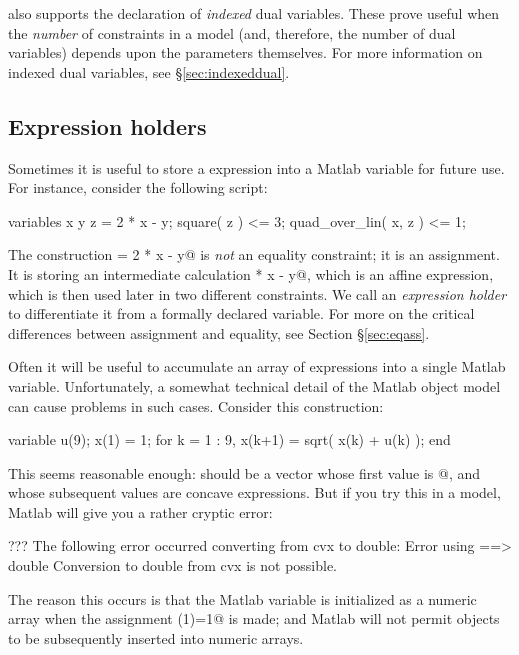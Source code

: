 \documentclass[12pt]{article}
\begin{document}
\cvx also supports the declaration of \emph{indexed} dual
variables. These prove useful when the \emph{number} of constraints in
a model (and, therefore, the number of dual variables) depends upon the
parameters themselves. For more information on indexed dual variables,
see \S\ref{sec:indexeddual}.

\subsection{Expression holders}
\label{sec:holders}

Sometimes it is useful to store a \cvx expression into a Matlab variable for
future use. For instance, consider the following \cvx script:
\begin{code}
	variables x y
	z = 2 * x - y;
	square( z ) <= 3;
	quad_over_lin( x, z ) <= 1;
\end{code}
The construction \verb@z = 2 * x - y@ is \emph{not} an equality constraint; it
is an assignment. It is storing an intermediate calculation  * x - y@,
which is an affine expression,
which is then used later in two different constraints. We call \verb@z@ an
\emph{expression holder} to differentiate it from a 
formally declared \verb@cvx@ variable. For more on the critical
differences between assignment and equality, see Section \S\ref{sec:eqass}.

Often it will be useful to accumulate an array of expressions into a single
Matlab variable. 
Unfortunately, a somewhat technical detail of the Matlab object
model can cause problems in such cases. Consider this construction:
\begin{code}
variable u(9);
x(1) = 1;
for k = 1 : 9,
    x(k+1) = sqrt( x(k) + u(k) );
end
\end{code}
This seems reasonable enough: \verb@x@ should be a vector whose first value is
@, and whose subsequent values are concave \cvx expressions. 
But if you try this in a \cvx model, Matlab will give you a rather 
cryptic error:
\begin{code}
??? The following error occurred converting from cvx to double:
Error using ==> double
Conversion to double from cvx is not possible.
\end{code}
The reason this occurs is that the Matlab variable \verb@x@ is initialized as
a numeric array when the assignment \verb@x(1)=1@ is made;
and Matlab will not permit \cvx objects to be subsequently inserted into 
numeric arrays. 
\end{document}
